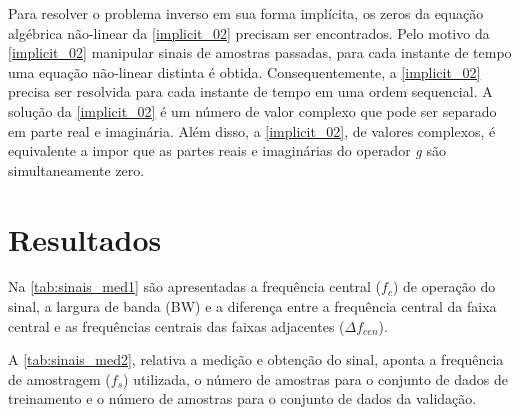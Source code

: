 Para resolver o problema inverso em sua forma implícita, os zeros da equação algébrica não-linear da \autoref{implicit_02} precisam ser encontrados. Pelo motivo da \autoref{implicit_02} manipular sinais de amostras passadas, para cada instante de tempo uma equação não-linear distinta é obtida. Consequentemente, a \autoref{implicit_02} precisa ser resolvida para cada instante de tempo em uma ordem sequencial. A solução da \autoref{implicit_02} é um número de valor complexo que pode ser separado em parte real e imaginária. Além disso, a \autoref{implicit_02}, de valores complexos, é equivalente a impor que as partes reais e imaginárias do operador \textit{g} são simultaneamente zero.

\section{Resultados} \label{sec:estudoii-3}

Na \autoref{tab:sinais_med1} são apresentadas a frequência central ($f_{c}$) de operação do sinal, a largura de banda (BW) e a diferença entre a frequência central da faixa central e as frequências centrais das faixas adjacentes ($\Delta f_{cen}$).

A \autoref{tab:sinais_med2}, relativa a medição e obtenção do sinal, aponta a frequência de amostragem ($f_{s}$) utilizada, o número de amostras para o conjunto de dados de treinamento e o número de amostras para o conjunto de dados da validação.

